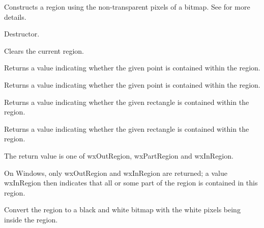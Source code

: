 
Constructs a region using the non-transparent pixels of a bitmap.  See
 for more details.




Destructor.

\label{wxregionclear}


Clears the current region.

\label{wxregioncontains}


Returns a value indicating whether the given point is contained within the region.


Returns a value indicating whether the given point is contained within the region.


Returns a value indicating whether the given rectangle is contained within the region.


Returns a value indicating whether the given rectangle is contained within the region.


The return value is one of wxOutRegion, wxPartRegion and wxInRegion.

On Windows, only wxOutRegion and wxInRegion are returned; a value wxInRegion then indicates that
all or some part of the region is contained in this region.

\label{wxregionconverttobitmap}


Convert the region to a black and white bitmap with the white pixels
being inside the region.

